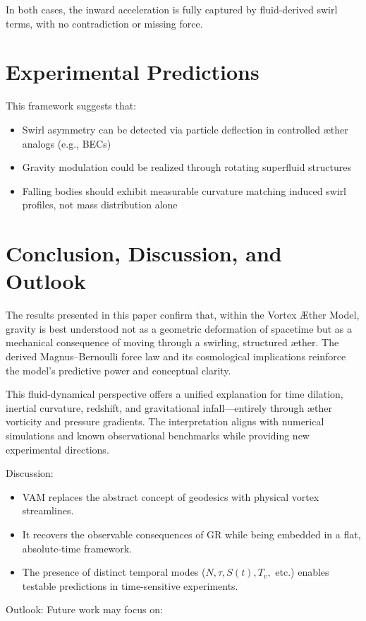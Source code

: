 \documentclass[11pt]{article}
\begin{document}
    In both cases, the inward acceleration is fully captured by fluid-derived swirl terms, with no contradiction or missing force.

    \section*{Experimental Predictions}

    This framework suggests that:
    \begin{itemize}
        \item Swirl asymmetry can be detected via particle deflection in controlled \ae ther analogs (e.g., BECs)
        \item Gravity modulation could be realized through rotating superfluid structures
        \item Falling bodies should exhibit measurable curvature matching induced swirl profiles, not mass distribution alone
    \end{itemize}


    \section*{Conclusion, Discussion, and Outlook}
    The results presented in this paper confirm that, within the Vortex Æther Model, gravity is best understood not as a geometric deformation of spacetime but as a mechanical consequence of moving through a swirling, structured æther. The derived Magnus–Bernoulli force law and its cosmological implications reinforce the model’s predictive power and conceptual clarity.

    This fluid-dynamical perspective offers a unified explanation for time dilation, inertial curvature, redshift, and gravitational infall—entirely through æther vorticity and pressure gradients. The interpretation aligns with numerical simulations and known observational benchmarks while providing new experimental directions.

    Discussion:

    \begin{itemize}
        \item VAM replaces the abstract concept of geodesics with physical vortex streamlines.
        \item It recovers the observable consequences of GR while being embedded in a flat, absolute-time framework.
        \item The presence of distinct temporal modes (\(N, \tau, S(t), T_v,\) etc.) enables testable predictions in time-sensitive experiments.
    \end{itemize}
    Outlook:
    Future work may focus on:
\end{document}
